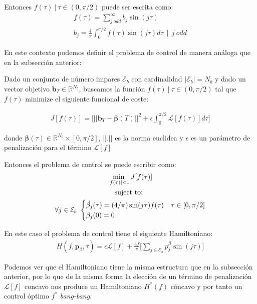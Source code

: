 Entonces  $f(\tau) \ | \ \tau \in (0,\pi/2)$ puede ser escrita como:
\begin{gather}
    f(\tau ) = \sum_{j \ odd}^\infty  b_j \sin(j \tau) \\
    b_j = \frac{4}{\pi}\int_0^{\pi/2} f(\tau ) \sin(j\tau)d\tau \ \ | \ \ j \ odd \label{bn_odd}
\end{gather}

En este contexto podemos definir el problema de control de manera análoga que en la subsección anterior:
\begin{problem}\label{OCP_bn}
    Dado un conjunto de número impares $\mathcal{E}_b$ con cardinalidad $|\mathcal{E}_b| = N_b$ y dado un vector objetivo $\bm{b}_T  \in \mathbb{R}^{N_b}$, buscamos la función $f(\tau ) \ | \ \tau \in (0,\pi/2)$ tal que  $f(\tau)$ minimize el siguiente funcional de coste:

        \begin{gather}
        J[f(\tau)] = \Bigg[ || \bm{b}_T - \bm{\beta}(T)||^2 + \epsilon \int_0^{\pi/2} \mathcal{L}[f(\tau)] d\tau \Bigg] 
    \end{gather}

    donde $ \bm{\beta}(\tau) \in \mathbb{R}^{N_b} \times [0,\pi/2] $,  $||.||$ es la norma euclidea y $\epsilon$ es un parámetro de penalización para el término $\mathcal{L}[f]$
    \newline

    Entonces el problema de control se puede escribir como:
    \begin{gather}
        \min_{|f(\tau) |<1} J[f(\tau)] \\
        \notag \text{suject to: } \\
        \notag \forall j \in \mathcal{E}_b \
        \begin{cases}
            \dot{\beta_j}(\tau) = (4/\pi) \sin(j\tau) f(\tau) & \tau \in [0,\pi/2]\label{dyn}\\
            \beta_j(0) = 0
        \end{cases} 
    \end{gather}
\end{problem}

En este caso el problema de control tiene el siguiente Hamiltoniano:
\begin{gather}
    H(f,\bm{p}_\beta,\tau) = \epsilon  \mathcal{L}[f]+ 
    \frac{4f}{\pi} \Bigg[ 
        \sum_{j \in \mathcal{E}_b} p^\beta_j \sin(j\tau) 
    \Bigg]
\end{gather}

Podemos ver que el Hamiltoniano tiene la misma estructura que en la subsección anterior, por lo que de la misma forma la elección de un término de penalización $\mathcal{L}[f]$ concavo nos produce un Hamiltoniano $H^*(f)$ cóncavo y por tanto un control óptimo $f^*$ \emph{bang-bang}.
